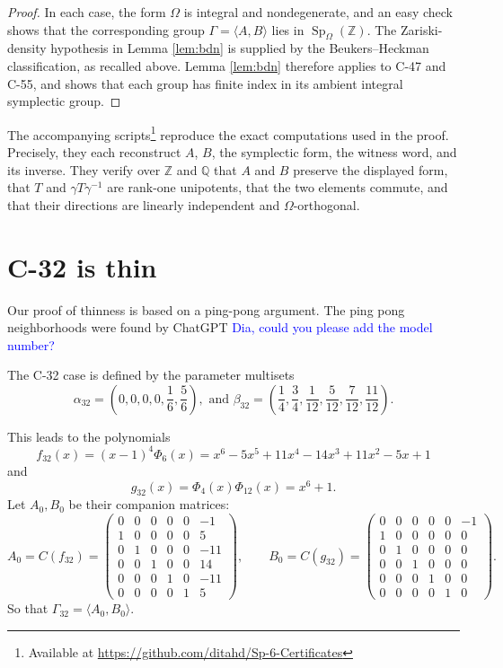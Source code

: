 \documentclass[11pt]{article}
\DeclareMathOperator{\Sp}{Sp}
\newcommand{\ZZ}{\mathbb{Z}}
\newcommand{\QQ}{\mathbb{Q}}
\begin{document}
\begin{proof}
In each case, the form $\Omega$ is integral and nondegenerate, and an easy check shows that the corresponding group $\Gamma=\langle A,B\rangle$ lies in $\Sp_\Omega(\ZZ)$. 
The Zariski-density hypothesis in Lemma \ref{lem:bdn} is supplied by the Beukers--Heckman classification, as recalled above.  
Lemma \ref{lem:bdn} therefore applies to C-47 and C-55, and shows that each group has finite index in its ambient integral symplectic group.
\end{proof}

The accompanying
scripts\footnote{Available at \url{https://github.com/ditahd/Sp-6-Certificates}} reproduce the exact computations used in the proof. 
Precisely, they each reconstruct $A$, $B$, the symplectic form, the witness word, and its inverse. 
They verify over $\ZZ$ and $\QQ$ that $A$ and $B$ preserve the displayed form, that $T$ and $\gamma T\gamma^{-1}$ are rank-one unipotents, that the two elements commute, and that their directions are linearly independent and $\Omega$-orthogonal.


\section{C-32 is thin}

Our proof of thinness is based on a ping-pong argument. 
The ping pong neighborhoods were found by ChatGPT \textcolor{blue}{Dia, could you please add the model number?}

\medskip

The C-32 case is defined by the parameter multisets
\[ \alpha_{32} = \left( 0,0,0,0,\frac{1}{6},\frac{5}{6}\right) , \text{ and } \beta_{32} = \left( \frac{1}{4},\frac{3}{4},\frac{1}{12},\frac{5}{12},\frac{7}{12},\frac{11}{12}\right) .\]

This leads to the polynomials
\begin{equation*}
  f_{32}(x)=(x-1)^4\Phi_6(x)
  =x^6-5x^5+11x^4-14x^3+11x^2-5x+1
\end{equation*}
and
\begin{equation*}
  g_{32}(x)=\Phi_4(x)\Phi_{12}(x)=x^6+1.
\end{equation*}
Let $A_0,B_0$ be their companion matrices:
\begin{equation*}
A_0 = C(f_{32}) =
\begin{pmatrix}
0&0&0&0&0&-1\\
1&0&0&0&0&5\\
0&1&0&0&0&-11\\
0&0&1&0&0&14\\
0&0&0&1&0&-11\\
0&0&0&0&1&5
\end{pmatrix},
\qquad
B_0 = C(g_{32}) =
\begin{pmatrix}
0&0&0&0&0&-1\\
1&0&0&0&0&0\\
0&1&0&0&0&0\\
0&0&1&0&0&0\\
0&0&0&1&0&0\\
0&0&0&0&1&0
\end{pmatrix}.
\end{equation*}
So that $\Gamma_{32} = \langle A_0,B_0 \rangle$.
\end{document}
